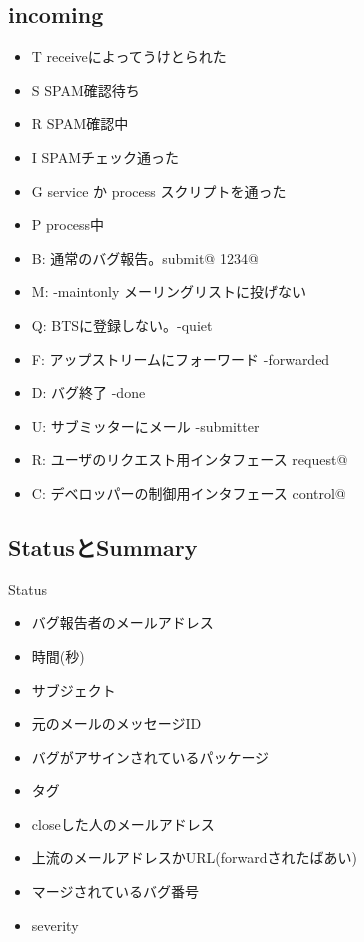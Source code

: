 \documentclass[cjk,dvipdfmx]{beamer}
\begin{document}
\subsection{incoming}

\begin{frame}
 \begin{itemize}
 \item T receiveによってうけとられた
 \item S SPAM確認待ち
 \item R SPAM確認中
 \item I SPAMチェック通った
 \item G service か process スクリプトを通った
 \item P process中
 \end{itemize}
\end{frame}

\begin{frame}
 
 \begin{itemize}
 \item B: 通常のバグ報告。submit@ 1234@
 \item M: -maintonly メーリングリストに投げない
 \item Q: BTSに登録しない。-quiet
 \item F: アップストリームにフォーワード -forwarded
 \item D: バグ終了 -done
 \item U: サブミッターにメール -submitter
 \item R: ユーザのリクエスト用インタフェース request@
 \item C: デベロッパーの制御用インタフェース control@
 \end{itemize}
\end{frame}

\subsection{StatusとSummary}

\begin{frame}
 Status
 \begin{itemize}
 \item バグ報告者のメールアドレス
 \item 時間(秒)
 \item サブジェクト
 \item 元のメールのメッセージID
 \item バグがアサインされているパッケージ
 \item タグ
 \item closeした人のメールアドレス
 \item 上流のメールアドレスかURL(forwardされたばあい)
 \item マージされているバグ番号
 \item severity
 \end{itemize}
\end{frame}
\end{document}
